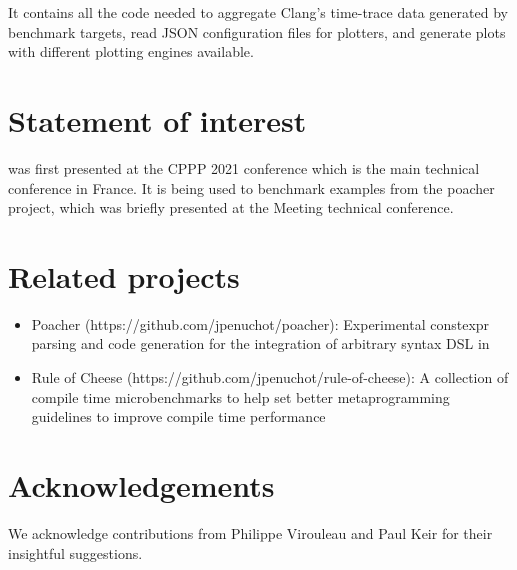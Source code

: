 \documentclass[../../main.tex]{subfiles}
\begin{document}
It contains all the code needed to aggregate Clang's time-trace data generated
by \ctbench benchmark targets, read JSON configuration files for plotters, and
generate plots with different plotting engines available.


\section{Statement of interest} %

\ctbench was first presented at the CPPP 2021 conference\cite{ctbench-cppp21}
which is the main \cpp technical conference in France. It is being used to
benchmark examples from the poacher\cite{poacher} project, which was briefly
presented at the Meeting \cite{meetingcpp22} technical conference.

\section{Related projects} %

\begin{itemize}

\item Poacher (https://github.com/jpenuchot/poacher): Experimental constexpr
      parsing and code generation for the integration of arbitrary syntax DSL in

\item Rule of Cheese (https://github.com/jpenuchot/rule-of-cheese):
      A collection of compile time microbenchmarks to help set better
      \cpp metaprogramming guidelines to improve compile time performance
\end{itemize}

\section{Acknowledgements}

We acknowledge contributions from Philippe Virouleau and Paul Keir for their
insightful suggestions.
\end{document}
